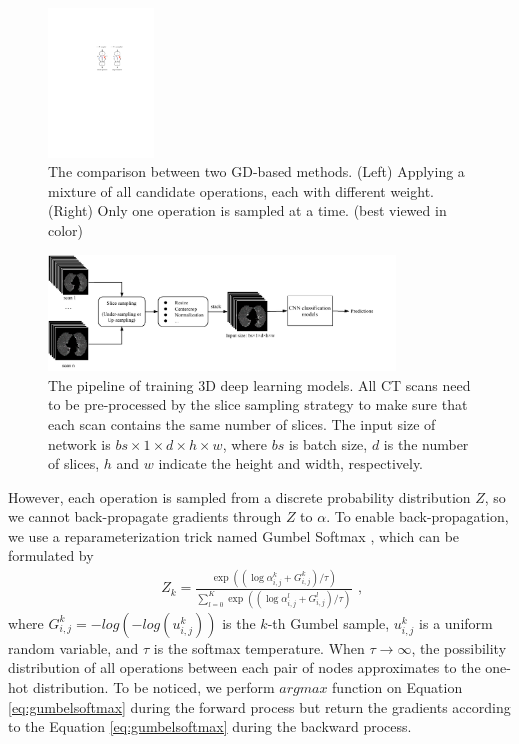 \documentclass[letterpaper]{article}
\begin{document}
\begin{figure}[!ht]
    \centering
    \includegraphics[width=0.25\textwidth, height=0.25\textwidth]{images/dag.pdf}
    \caption{The comparison between two GD-based methods. (Left) Applying a mixture of all candidate operations, each with different weight. (Right) Only one operation is sampled at a time. (best viewed in color)}
    \label{fig:dag}
\end{figure}


\begin{figure}[!ht]
    \centering
    \includegraphics[width=0.82\textwidth, height=0.25\textwidth]{images/covid_pipeline.pdf}
    \caption{The pipeline of training 3D deep learning models. All CT scans need to be pre-processed by the slice sampling strategy to make sure that each scan contains the same number of slices. The input size of network is $bs\times 1\times d\times h\times w$, where $bs$ is batch size, $d$ is the number of slices, $h$ and $w$ indicate the height and width, respectively.}
    \label{fig:pipeline}
\end{figure}


However, each operation is sampled from a discrete probability distribution $Z$, so we cannot back-propagate gradients through $Z$ to $\alpha$. To enable back-propagation, we use a reparameterization trick named Gumbel Softmax \cite{Gumbel_Softmax}, which can be formulated by
\begin{equation}
\begin{array}{cl}
Z_k=\frac{\exp \left(\left(\log {\alpha}_{i, j}^{k}+{G}_{i, j}^{k}\right) / \tau\right)}{\sum_{l=0}^{K} \exp \left(\left(\log {\alpha}_{i, j}^{l}+{G}_{i, j}^{l}\right) / \tau\right)}
\end{array},
\label{eq:gumbelsoftmax}
\end{equation}
where ${G}_{i, j}^{k}=-log(-log(u_{i,j}^k))$ is the $k$-th Gumbel sample, $u_{i,j}^k$ is a uniform random variable, and $\tau$ is the softmax temperature. When $\tau \rightarrow \infty$, the possibility distribution of all operations between each pair of nodes approximates to the one-hot distribution. To be noticed, we perform $argmax$ function on Equation \ref{eq:gumbelsoftmax} during the forward process but return the gradients according to the Equation \ref{eq:gumbelsoftmax} during the backward process.
\end{document}
